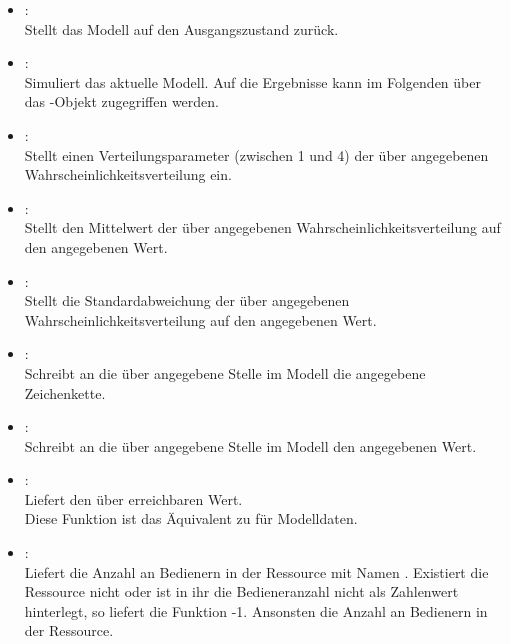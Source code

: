 \begin{itemize}

\item
{}:\\
Stellt das Modell auf den Ausgangszustand zurück.

\item
{}:\\
Simuliert das aktuelle Modell.
Auf die Ergebnisse kann im Folgenden über das -Objekt zugegriffen werden.

\item
{}:\\
Stellt einen Verteilungsparameter  (zwischen 1 und 4) der über 
angegebenen Wahrscheinlichkeitsverteilung ein.

\item
{}:\\
Stellt den Mittelwert der über  angegebenen Wahrscheinlichkeitsverteilung auf den angegebenen Wert.

\item
{}:\\
Stellt die Standardabweichung der über  angegebenen Wahrscheinlichkeitsverteilung auf den angegebenen Wert.

\item
{}:\\
Schreibt an die über  angegebene Stelle im Modell die angegebene Zeichenkette.

\item
{}:\\
Schreibt an die über  angegebene Stelle im Modell den angegebenen Wert.

\item
{}:\\
Liefert den über  erreichbaren Wert.\\
Diese Funktion ist das Äquivalent zu  für Modelldaten.

\item
{}:\\
Liefert die Anzahl an Bedienern in der Ressource mit Namen .
Existiert die Ressource nicht oder ist in ihr die Bedieneranzahl nicht als Zahlenwert
hinterlegt, so liefert die Funktion -1. Ansonsten die Anzahl an Bedienern in der
Ressource.


\end{itemize}
